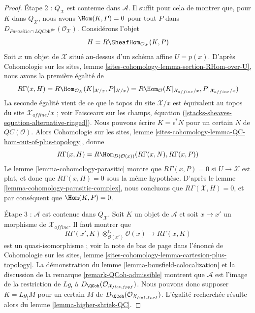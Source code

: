 \begin{proof}
\medskip\noindent
Étape 2 : $Q_\mathcal{X}$ est contenue dans $\mathcal{A}$. Il suffit pour cela
de montrer que, pour $K$ dans $Q_\mathcal{X}$, nous avons
$\Hom(K, P) = 0$ pour tout $P$ dans
$D_{\textit{Parasitic} \cap \textit{LQCoh}^{fbc}}(\mathcal{O}_\mathcal{X})$.
Considérons l'objet
$$
H = R\SheafHom_{\mathcal{O}_\mathcal{X}}(K, P)
$$
Soit $x$ un objet de $\mathcal{X}$ situé au-dessus d'un schéma affine
$U = p(x)$. D'après Cohomologie sur les sites, lemme
\ref{sites-cohomology-lemma-section-RHom-over-U}, nous avons la première
égalité de
$$
R\Gamma(x, H) =
R\Hom_{\mathcal{O}_\mathcal{X}}(K|_{\mathcal{X}/x}, P|_{\mathcal{X}/x}) =
R\Hom_{\mathcal{O}}(K|_{\mathcal{X}_{affine}/x}, P|_{\mathcal{X}_{affine}/x})
$$
La seconde égalité vient de ce que le topos du site $\mathcal{X}/x$ est
équivalent au topos du site $\mathcal{X}_{affine}/x$ ; voir Faisceaux sur les
champs, équation (\ref{stacks-sheaves-equation-alternative-ringed}). Nous
pouvons écrire $K = \epsilon^*N$ pour un certain $N$ de
$\mathit{QC}(\mathcal{O})$. Alors Cohomologie sur les sites, lemme
\ref{sites-cohomology-lemma-QC-hom-out-of-plus-topology}, donne
$$
R\Gamma(x, H) =
R\Hom_{D(\mathcal{O}(x))}(R\Gamma(x, N), R\Gamma(x, P))
$$
Le lemme \ref{lemma-cohomology-parasitic} montre que
$R\Gamma(x, P) = 0$ si $U \to \mathcal{X}$ est plat, et donc que
$R\Gamma(x, H) = 0$ sous la même hypothèse. D'après le lemme
\ref{lemma-cohomology-parasitic-complex}, nous concluons que
$R\Gamma(\mathcal{X}, H) = 0$, et par conséquent que $\Hom(K, P) = 0$.

\medskip\noindent
Étape 3 : $\mathcal{A}$ est contenue dans $Q_\mathcal{X}$. Soit $K$ un objet de
$\mathcal{A}$ et soit $x \to x'$ un morphisme de
$\mathcal{X}_{affine}$. Il faut montrer que
$$
R\Gamma(x', K) \otimes_{\mathcal{O}(x')}^\mathbf{L} \mathcal{O}(x)
\longrightarrow
R\Gamma(x, K)
$$
est un quasi-isomorphisme ; voir la note de bas de page dans l'énoncé de
Cohomologie sur les sites, lemme
\ref{sites-cohomology-lemma-cartesion-plus-topology}. La démonstration du lemme
\ref{lemma-bousfield-colocalization} et la discussion de la remarque
\ref{remark-QCoh-admissible} montrent que $\mathcal{A}$ est l'image de la
restriction de $Lg_!$ à
$D_\QCoh(\mathcal{O}_{\mathcal{X}_{flat, fppf}})$. Nous pouvons donc supposer
$K = Lg_!M$ pour un certain $M$ de
$D_\QCoh(\mathcal{O}_{\mathcal{X}_{flat, fppf}})$. L'égalité recherchée résulte
alors du lemme \ref{lemma-higher-shriek-QC}.
\end{proof}
























